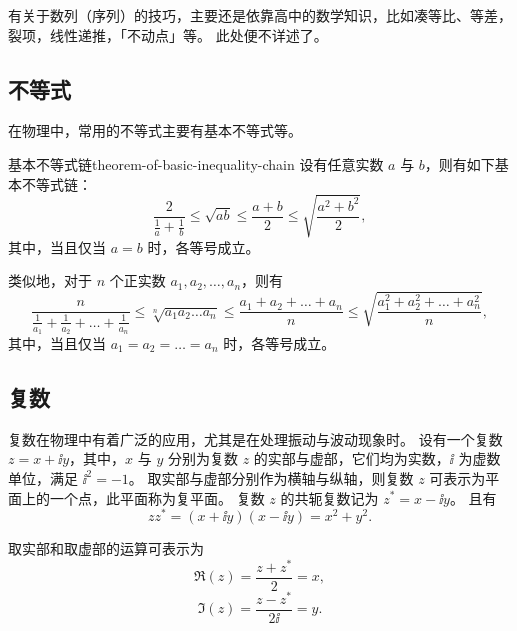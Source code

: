 有关于数列（序列）的技巧，主要还是依靠高中的数学知识，比如凑等比、等差，裂项，线性递推，「不动点」等。
此处便不详述了。


\subsection{不等式}\label{subsec:inequalities}

在物理中，常用的不等式主要有基本不等式等。
\begin{theorem}{基本不等式链}{theorem-of-basic-inequality-chain}
    设有任意实数 $ a $ 与 $ b $，则有如下基本不等式链：
    \begin{equation}
        \frac{2}{\frac{1}{a} + \frac{1}{b}} \leq \sqrt{ab} \leq \frac{a + b}{2} \leq \sqrt{\frac{a^2 + b^2}{2}} ,
    \end{equation}
    其中，当且仅当 $ a = b $ 时，各等号成立。
\end{theorem}
类似地，对于 $ n $ 个正实数 $ a_1 , a_2 , \ldots , a_n $，则有
\begin{equation}
    \frac{n}{\frac{1}{a_1} + \frac{1}{a_2} + \ldots + \frac{1}{a_n}} \leq \sqrt[n]{a_1 a_2 \ldots a_n} \leq \frac{a_1 + a_2 + \ldots + a_n}{n} \leq \sqrt{\frac{a_1^2 + a_2^2 + \ldots + a_n^2}{n}} ,
\end{equation}
其中，当且仅当 $ a_1 = a_2 = \ldots = a_n $ 时，各等号成立。

\subsection{复数}\label{subsec:complex-numbers}
复数在物理中有着广泛的应用，尤其是在处理振动与波动现象时。
设有一个复数 $ z = x + \ii y $，其中，$ x $ 与 $ y $ 分别为复数 $ z $ 的实部与虚部，它们均为实数，$ \ii $ 为虚数单位，满足 $ \ii^2 = -1 $。
取实部与虚部分别作为横轴与纵轴，则复数 $ z $ 可表示为平面上的一个点，此平面称为复平面。
复数 $ z $ 的共轭复数记为 $ z^* = x - \ii y $。
且有
\begin{equation}
    z z^* = (x + \ii y)(x - \ii y) = x^2 + y^2 .
\end{equation}

取实部和取虚部的运算可表示为
\begin{equation}
    \Re (z) = \frac{z + z^*}{2} = x ,
\end{equation}
\begin{equation}
    \Im (z) = \frac{z - z^*}{2 \ii} = y .
\end{equation}

